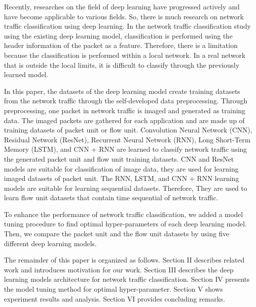Recently, researches on the field of deep learning have progressed actively and have become applicable to various fields.
So, there is much research on network traffic classification using deep learning.
In the network traffic classification study using the existing deep learning model, classification is performed using the header information of the packet as a feature.
Therefore, there is a limitation because the classification is performed within a local network.
In a real network that is outside the local limits, it is difficult to classify through the previously learned model.

In this paper, the datasets of the deep learning model create training datasets from the network traffic through the self-developed data preprocessing.
Through preprocessing, one packet in network traffic is imaged and generated as training data.
The imaged packets are gathered for each application and are made up of training datasets of packet unit or flow unit.
Convolution Neural Network (CNN), Residual Network (ResNet), Recurrent Neural Network (RNN), Long Short-Term Memory (LSTM), and CNN + RNN are learned to classify network traffic using the generated packet unit and flow unit training datasets.
CNN and ResNet models are suitable for classification of image data, they are used for learning imaged datasets of packet unit.
The RNN, LSTM, and CNN + RNN learning models are suitable for learning sequential datasets.
Therefore, They are used to learn flow unit datasets that contain time sequential of network traffic.

To enhance the performance of network traffic classification, we added a model tuning procedure to find optimal hyper-parameters of each deep learning model.
Then, we compare the packet unit and the flow unit datasets by using five different deep learning models.

The remainder of this paper is organized as follows.
Section II describes related work and introduces motivation for our work.
Section III describes the deep learning models architecture for network traffic classification.
Section IV presents the model tuning method for optimal hyper-parameter.
Section V shows experiment results and analysis.
Section VI provides concluding remarks.